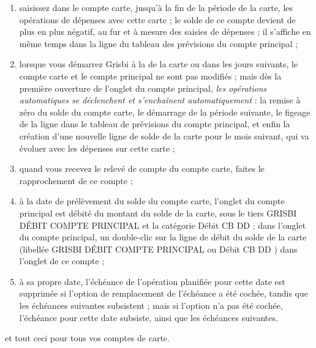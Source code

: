 \begin{enumerate}
	\item saisissez dans le compte carte, jusqu'à la fin de la période de la carte, les opérations de dépenses avec cette carte ; le solde de ce compte devient de plus en plus négatif, au fur et à mesure des saisies de dépenses ; il s'affiche en même temps dans la ligne  du tableau des prévisions du compte principal ;
	\item lorsque vous démarrez Grisbi à la  de la carte ou dans les jours suivants, le compte carte et le compte principal ne sont pas modifiés ; mais dès la première ouverture de l'onglet  du compte principal, \emph{les opérations automatiques se déclenchent et s'enchaînent automatiquement} : la remise à zéro du solde du compte carte, le démarrage de la période suivante, le figeage de la ligne  dans le tableau de prévisions du compte principal, et enfin la création d'une nouvelle ligne de solde de la carte pour le mois suivant, qui va évoluer avec les dépenses sur cette carte ;
	\item quand vous recevez le relevé de compte du compte carte, faites le rapprochement de ce compte ;	
	\item à la date de prélèvement du solde du compte carte, l'onglet  du compte principal est débité du montant du solde de la carte, sous le tiers \og GRISBI DÉBIT COMPTE PRINCIPAL \fg{} et la catégorie \og Débit CB DD \fg{} ; dans l'onglet  du compte principal, un double-clic sur la ligne de débit du solde de la carte (libellée \og GRISBI DÉBIT COMPTE PRINCIPAL \fg{} ou \og Débit CB DD \fg{})   dans l'onglet  de ce compte ;
	\item à sa propre date, l'échéance de l'opération planifiée pour cette date  est supprimée si l'option de remplacement de l'échéance a été cochée, tandis que les échéances suivantes subsistent ; mais si l'option n'a pas été cochée, l'échéance pour cette date subsiste, ainsi que les échéances suivantes.
\end{enumerate}

et tout ceci pour tous vos comptes de carte.

